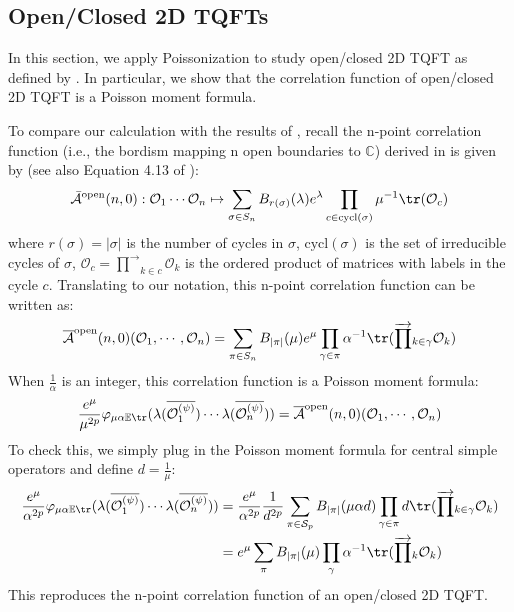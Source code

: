 \documentclass[a4paper,11pt]{article}
\theoremstyle{definition}
\numberwithin{equation}{section}
\begin{document}
\subsection{Open/Closed 2D TQFTs}\label{subsection:openclosedappendix}

In this section, we apply Poissonization to study open/closed 2D TQFT as defined by \cite{@Moore-Segal, banerjee2022comments, gardiner20212D}. In particular, we show that the correlation function of open/closed 2D TQFT is a Poisson moment formula. 

To compare our calculation with the results of \cite{banerjee2022comments}, recall the n-point correlation function (i.e., the bordism mapping n open boundaries to $\mathbb{C}$) derived in \cite{banerjee2022comments} is given by (see also Equation 4.13 of \cite{banerjee2022comments}):
\begin{equation}
    \bar{\mathcal{A}}^\text{open}(n,0):\mathcal{O}_1\cdots\mathcal{O}_n\mapsto \sum_{\sigma\in S_n}B_{r(\sigma)}(\lambda)e^\lambda\prod_{c\in\text{cycl}(\sigma)}\mu^{-1}\tr(\mathcal{O}_c)
\end{equation}
where $r(\sigma) = |\sigma|$ is the number of cycles in $\sigma$, $\text{cycl}(\sigma)$ is the set of irreducible cycles of $\sigma$, $\mathcal{O}_c = \overrightarrow{\prod}_{k\in c}\mathcal{O}_k$ is the ordered product of matrices with labels in the cycle $c$. Translating to our notation, this n-point correlation function can be written as:
\begin{equation}
    \overline{\mathcal{A}}^\text{open}(n,0)(\mathcal{O}_1,\cdots,\mathcal{O}_n) = \sum_{\pi\in S_n}B_{|\pi|}(\mu)e^\mu\prod_{\gamma\in\pi}\alpha^{-1}\tr(\overrightarrow{\prod}_{k\in\gamma}\mathcal{O}_k)
\end{equation}
When $\frac{1}{\alpha}$ is an integer, this correlation function is a Poisson moment formula:
\begin{equation}
    \frac{e^\mu}{\mu^{2p}}\varphi_{\mu\alpha\mathbb{E}\tr}(\lambda(\overline{\mathcal{O}^{(\psi)}_1})\cdots\lambda(\overline{\mathcal{O}^{(\psi)}_n})) = \overline{\mathcal{A}}^\text{open}(n,0)(\mathcal{O}_1,\cdots,\mathcal{O}_n)
\end{equation}
To check this, we simply plug in the Poisson moment formula for central simple operators and define $d = \frac{1}{\mu}$:
\begin{align}
    \begin{split}
        \frac{e^\mu}{\alpha^{2p}}\varphi_{\mu\alpha\mathbb{E}\tr}(\lambda(\overline{\mathcal{O}^{(\psi)}_1})\cdots\lambda(\overline{\mathcal{O}^{(\psi)}_n})) &= \frac{e^\mu}{\alpha^{2p}}\frac{1}{d^{2p}}\sum_{\pi\in\mathcal{S}_p}B_{|\pi|}(\mu\alpha d)\prod_{\gamma\in\pi}d\tr(\overrightarrow{\prod}_{k\in\gamma}\mathcal{O}_k)
        \\&=e^\mu\sum_\pi B_{|\pi|}(\mu)\prod_\gamma\alpha^{-1}\tr(\overrightarrow{\prod}_k \mathcal{O}_k)
    \end{split}
\end{align}
This reproduces the n-point correlation function of an open/closed 2D TQFT.
\end{document}
